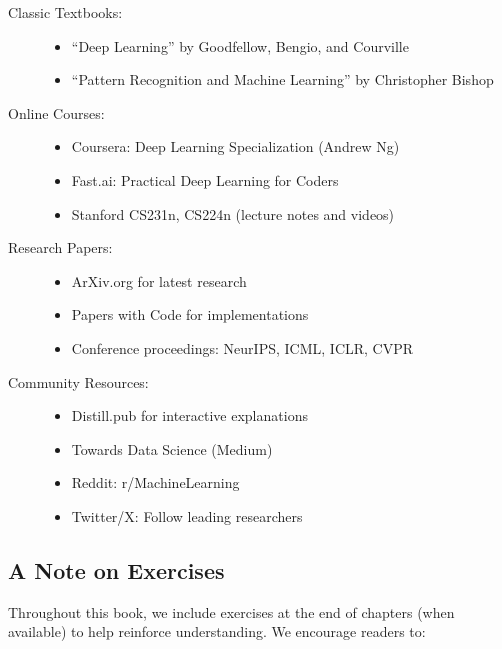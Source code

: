 \begin{description}
    \item[Classic Textbooks:]
    \begin{itemize}
        \item ``Deep Learning'' by Goodfellow, Bengio, and Courville
        \item ``Pattern Recognition and Machine Learning'' by Christopher Bishop
    \end{itemize}
    
    \item[Online Courses:]

    \begin{itemize}
        \item Coursera: Deep Learning Specialization (Andrew Ng)
        \item Fast.ai: Practical Deep Learning for Coders
        \item Stanford CS231n, CS224n (lecture notes and videos)
    \end{itemize}
    
    \item[Research Papers:]

    \begin{itemize}
        \item ArXiv.org for latest research
        \item Papers with Code for implementations
        \item Conference proceedings: NeurIPS, ICML, ICLR, CVPR
    \end{itemize}
    
    \item[Community Resources:]
    
    \begin{itemize}
        \item Distill.pub for interactive explanations
        \item Towards Data Science (Medium)
        \item Reddit: r/MachineLearning
        \item Twitter/X: Follow leading researchers
    \end{itemize}
\end{description}

\subsection{A Note on Exercises}

Throughout this book, we include exercises at the end of chapters (when available) to help reinforce understanding. We encourage readers to:

